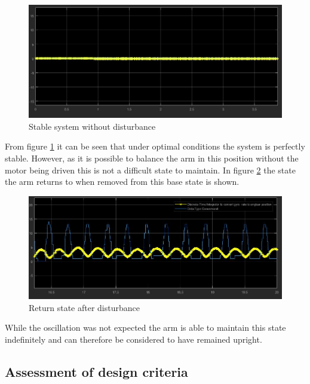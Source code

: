 \documentclass[11pt, a4paper,twocolumn]{article}
\begin{document}
	\begin{figure}[h!]
	\begin{center}
	\includegraphics[width=\linewidth]{Undisturbed}
	\caption{Stable system without disturbance}
	\label{fig:4.1}
	\end{center}
	\end{figure}
From figure \ref{fig:4.1} it can be seen that under optimal conditions the system is perfectly stable. However, as it is possible to balance the arm in this position without the motor being driven this is not a difficult state to maintain. In figure \ref{fig:4.2} the state the arm returns to when removed from this base state is shown.
	\begin{figure}[h!]
	\begin{center}
	\includegraphics[width=\linewidth]{Ocilation}
	\caption{Return state after disturbance}
	\label{fig:4.2}
	\end{center}
	\end{figure}
While the oscillation was not expected the arm is able to maintain this state indefinitely and can therefore be considered to have remained upright.

        \subsection{Assessment of design criteria}\label{subsec:assessment}
\end{document}

